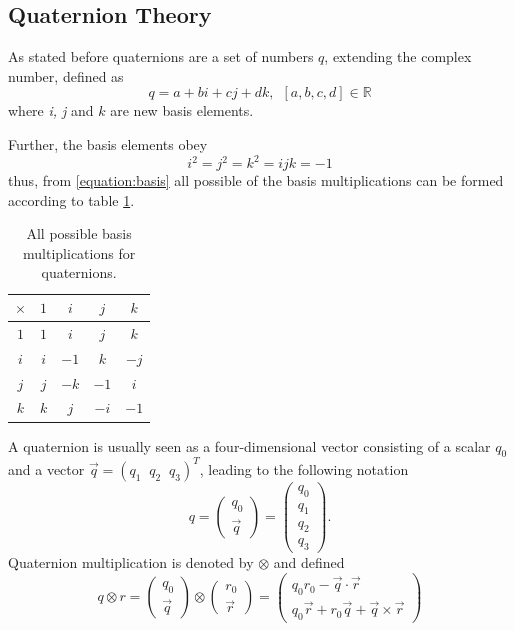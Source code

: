 \documentclass{LTHthesis}
\begin{document}
\subsection{Quaternion Theory}
%
As stated before quaternions are a set of numbers $q$, extending the complex number, defined as
%
\begin{equation}
q = a+bi+cj+dk, \hspace{5pt}[a,b,c,d]\in \mathbb R
\end{equation} 
%
where \emph{i, j} and $k$ are new basis elements.

Further, the basis elements obey
%
\begin{equation}
\label{equation:basis}
i^2=j^2=k^2=ijk=-1
\end{equation}
%
thus, from \ref{equation:basis} all possible of the basis multiplications can be formed according to table \ref{table:basis}.
%
\begin{table}[!hbt]
\begin{center}
\begin{tabular}{|c|c|c|c|c|}
\hline
$\times$ & $1$ & $i$ & $j$ & $k$ \\
\hline
$1$ & $1$ & $i$ & $j$ & $k$ \\
\hline 
$i$ & $i$ & $-1$ & $k$ & $-j$\\
\hline
$j$ & $j$ & $-k$ & $-1$ & $i$ \\
\hline
$k$ & $k$ & $j$ & $-i$ & $-1$ \\
\hline
\end{tabular}
\end{center}
\caption{All possible basis multiplications for quaternions.}
\label{table:basis}
\end{table}
%
A quaternion is usually seen as a four-dimensional vector consisting of a scalar $q_0$ and a vector $\vec{q} = (q_1 \; \; q_2 \; \; q_3)^T$, leading to the following notation
%
\begin{equation}
q = \left(\begin{array}{c}q_0\\ \vec{q}\end{array}\right) = \left(\begin{array}{c}q_0\\ q_1 \\ q_2 \\ q_3\end{array}\right). 
\end{equation}  
%
Quaternion multiplication is denoted by $\otimes$ and defined 
%
\begin{equation}
q\otimes r = \left(\begin{array}{c}q_0\\ \vec{q}\end{array}\right) \otimes \left(\begin{array}{c}r_0\\ \vec{r}\end{array}\right) =
\left(\begin{array}{c}q_0r_0-\vec{q} \cdot \vec{r}\\ q_0\vec{r}+r_0\vec{q}+\vec{q}\times \vec{r}\end{array}\right)
\end{equation}
\end{document}
